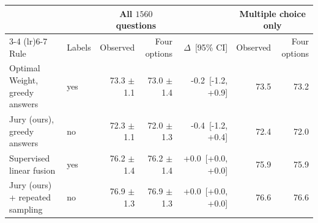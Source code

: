 \begin{tabular}{llrrrrr}
\toprule
& & \multicolumn{2}{c}{All $1560$ questions} & & \multicolumn{2}{c}{Multiple choice only} \\
\cmidrule(lr){3-4} \cmidrule(lr){6-7}
Rule & Labels & Observed & Four options & $\Delta$~[95\% CI] & Observed & Four options \\
\midrule
Optimal Weight, greedy answers & yes & 73.3 $\pm$ 1.1 & 73.0 $\pm$ 1.4 & -0.2~[-1.2, +0.9] & 73.5 & 73.2 \\
Jury (ours), greedy answers & no & 72.3 $\pm$ 1.1 & 72.0 $\pm$ 1.3 & -0.4~[-1.2, +0.4] & 72.4 & 72.0 \\
Supervised linear fusion & yes & 76.2 $\pm$ 1.4 & 76.2 $\pm$ 1.4 & +0.0~[+0.0, +0.0] & 75.9 & 75.9 \\
Jury (ours) + repeated sampling & no & 76.9 $\pm$ 1.3 & 76.9 $\pm$ 1.3 & +0.0~[+0.0, +0.0] & 76.6 & 76.6 \\
\bottomrule
\end{tabular}
